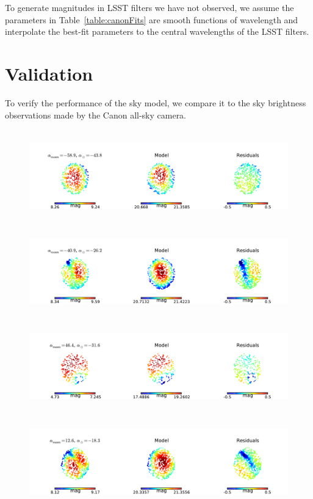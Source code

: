 \documentclass[]{spie}
\begin{document}
To generate magnitudes in LSST filters we have not observed, we assume the parameters in Table~\ref{table:canonFits} are smooth functions of wavelength and interpolate the best-fit parameters to the central wavelengths of the LSST filters.


\section{Validation}\label{sec:validate}

To verify the performance of the sky model, we compare it to the sky brightness observations made by the Canon all-sky camera.

\begin{figure}[ht]
  \begin{center}
  \includegraphics[height=4cm]{plots/exampleSkys_0.pdf} \\
  \includegraphics[height=4cm]{plots/exampleSkys_1.pdf} \\
  \includegraphics[height=4cm]{plots/exampleSkys_2.pdf} \\
  \includegraphics[height=4cm]{plots/exampleSkys_3.pdf}

\end{center}
\end{figure}
\end{document}
